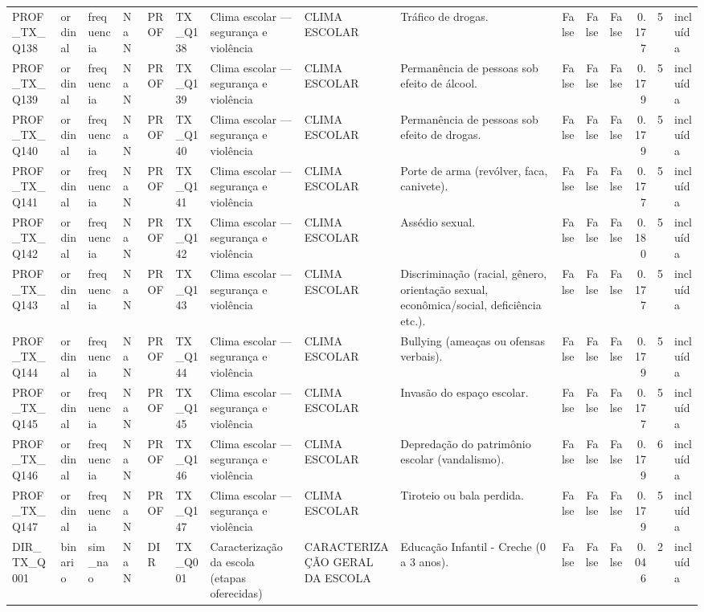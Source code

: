 \begin{tabular}{lllllllllrrrrrl}
PROF\_TX\_Q138 & ordinal & frequencia & NaN & PROF & TX\_Q138 & Clima escolar — segurança e violência & CLIMA ESCOLAR & Tráfico de drogas. & False & False & False & 0.177 & 5 & incluída \\
PROF\_TX\_Q139 & ordinal & frequencia & NaN & PROF & TX\_Q139 & Clima escolar — segurança e violência & CLIMA ESCOLAR & Permanência de pessoas sob efeito de álcool. & False & False & False & 0.179 & 5 & incluída \\
PROF\_TX\_Q140 & ordinal & frequencia & NaN & PROF & TX\_Q140 & Clima escolar — segurança e violência & CLIMA ESCOLAR & Permanência de pessoas sob efeito de drogas. & False & False & False & 0.179 & 5 & incluída \\
PROF\_TX\_Q141 & ordinal & frequencia & NaN & PROF & TX\_Q141 & Clima escolar — segurança e violência & CLIMA ESCOLAR & Porte de arma (revólver, faca, canivete). & False & False & False & 0.177 & 5 & incluída \\
PROF\_TX\_Q142 & ordinal & frequencia & NaN & PROF & TX\_Q142 & Clima escolar — segurança e violência & CLIMA ESCOLAR & Assédio sexual. & False & False & False & 0.180 & 5 & incluída \\
PROF\_TX\_Q143 & ordinal & frequencia & NaN & PROF & TX\_Q143 & Clima escolar — segurança e violência & CLIMA ESCOLAR & Discriminação (racial, gênero, orientação sexual, econômica/social, deficiência etc.). & False & False & False & 0.177 & 5 & incluída \\
PROF\_TX\_Q144 & ordinal & frequencia & NaN & PROF & TX\_Q144 & Clima escolar — segurança e violência & CLIMA ESCOLAR & Bullying (ameaças ou ofensas verbais). & False & False & False & 0.179 & 5 & incluída \\
PROF\_TX\_Q145 & ordinal & frequencia & NaN & PROF & TX\_Q145 & Clima escolar — segurança e violência & CLIMA ESCOLAR & Invasão do espaço escolar. & False & False & False & 0.177 & 5 & incluída \\
PROF\_TX\_Q146 & ordinal & frequencia & NaN & PROF & TX\_Q146 & Clima escolar — segurança e violência & CLIMA ESCOLAR & Depredação do patrimônio escolar (vandalismo). & False & False & False & 0.179 & 6 & incluída \\
PROF\_TX\_Q147 & ordinal & frequencia & NaN & PROF & TX\_Q147 & Clima escolar — segurança e violência & CLIMA ESCOLAR & Tiroteio ou bala perdida. & False & False & False & 0.179 & 5 & incluída \\
DIR\_TX\_Q001 & binario & sim\_nao & NaN & DIR & TX\_Q001 & Caracterização da escola (etapas oferecidas) & CARACTERIZAÇÃO GERAL DA ESCOLA & Educação Infantil  -  Creche  (0 a 3 anos). & False & False & False & 0.046 & 2 & incluída \\

\end{tabular}
